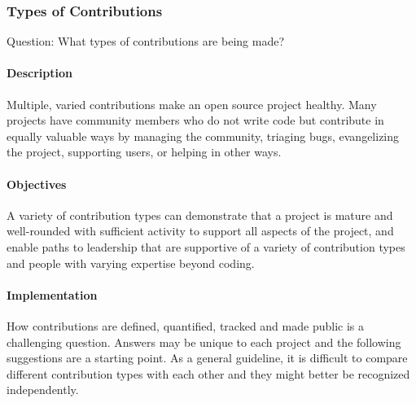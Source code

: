\hypertarget{types-of-contributions}{%
\subsubsection{Types of Contributions}\label{types-of-contributions}}

Question: What types of contributions are being made?

\hypertarget{description}{%
\paragraph{Description}\label{description}}

Multiple, varied contributions make an open source project healthy. Many
projects have community members who do not write code but contribute in
equally valuable ways by managing the community, triaging bugs,
evangelizing the project, supporting users, or helping in other ways.

\hypertarget{objectives}{%
\paragraph{Objectives}\label{objectives}}

A variety of contribution types can demonstrate that a project is mature
and well-rounded with sufficient activity to support all aspects of the
project, and enable paths to leadership that are supportive of a variety
of contribution types and people with varying expertise beyond coding.

\hypertarget{implementation}{%
\paragraph{Implementation}\label{implementation}}

How contributions are defined, quantified, tracked and made public is a
challenging question. Answers may be unique to each project and the
following suggestions are a starting point. As a general guideline, it
is difficult to compare different contribution types with each other and
they might better be recognized independently.


